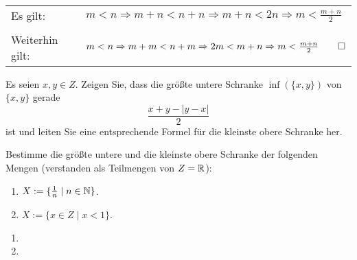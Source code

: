 \bigskip

\begin{lsg}[L\"osung~2]
	~\\[2ex]
	\begin{tabular}{ll}
		Es gilt: & $m<n \Rightarrow m+n<n+n \Rightarrow m+n<2n \Rightarrow m< \frac{m+n}{2}$ \\
		&\\
	Weiterhin gilt: & $m<n \Rightarrow m+m < n+m \Rightarrow 2m < m+n \Rightarrow m<\frac{m+n}{2} \qed$\\
	\end{tabular}



\end{lsg}


\bigskip


\begin{aufg}[6 Punkte]
Es seien $x,y\in Z$. Zeigen Sie, dass die gr\"o{\ss}te untere Schranke $\inf(\{x,y\})$ von $\{x,y\}$ gerade 
\[
\frac{x+y - |y-x|}{2}
\]
ist und leiten Sie eine entsprechende Formel f\"ur die kleinste obere Schranke her.
\end{aufg}


\bigskip

\begin{lsg}
\end{lsg}


\bigskip


\begin{aufg}[6 Punkte]
Bestimme die gr\"o{\ss}te untere und die kleinste obere Schranke der folgenden Mengen (verstanden als Teilmengen von $Z=\mathbb{R}$):
\begin{enumerate}[label=$\mathrm{(\roman*)}$, ref=$\mathrm{\roman*}$]
\item $X:=\{ \frac{1}{n} \mid n\in \mathbb{N}\}$.
\item $X:=\{ x \in Z \mid x < 1 \}$.
\end{enumerate}
\end{aufg}
 
\bigskip

\begin{lsg}
\begin{enumerate}[label=$\mathrm{(\roman*)}$, ref=$\mathrm{\roman*}$]
\item 
\item 
\end{enumerate}
\end{lsg}


